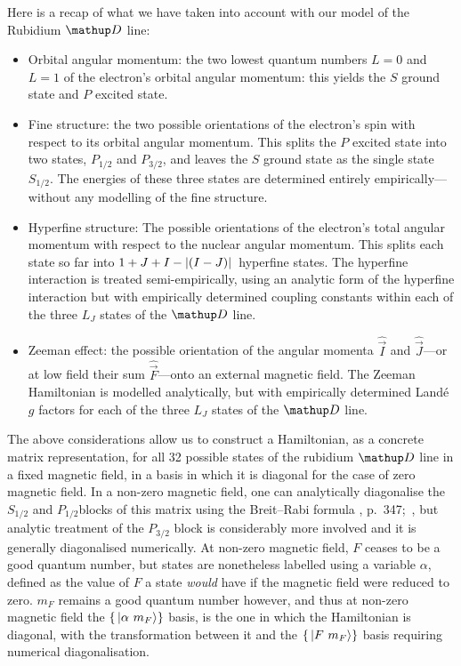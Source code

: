 Here is a recap of what we have taken into account with our model of the Rubidium $\up{D}$ line:
\begin{itemize}
    \item Orbital angular momentum: the two lowest quantum numbers $L=0$ and $L=1$ of the electron's orbital angular momentum: this yields the $S$ ground state and $P$ excited state.
    \item Fine structure: the two possible orientations of the electron's spin with respect to its orbital angular momentum. This splits the $P$ excited state into two states, $P_{1/2}$ and $P_{3/2}$, and leaves the $S$ ground state as the single state $S_{1/2}$. The energies of these three states are determined entirely empirically---without any modelling of the fine structure.
    \item Hyperfine structure: The possible orientations of the electron's total angular momentum with respect to the nuclear angular momentum. This splits each state so far into $1+J+I - \abs{(I - J)}$ hyperfine states. The hyperfine interaction is treated semi-empirically, using an analytic form of the hyperfine interaction but with empirically determined coupling constants within each of the three $L_J$ states of the $\up{D}$ line. 
    \item Zeeman effect: the possible orientation of the angular momenta $\hat{\vec I}$ and $\hat{\vec J}$---or at low field their sum $\hat{\vec F}$---onto an external magnetic field. The Zeeman Hamiltonian is modelled analytically, but with empirically determined Land\'e $g$ factors for each of the three $L_J$ states of the $\up{D}$ line. 
\end{itemize}

The above considerations allow us to construct a Hamiltonian, as a concrete matrix representation, for all 32 possible states of the rubidium $\up{D}$ line in a fixed magnetic field, in a basis in which it is diagonal for the case of zero magnetic field. In a non-zero magnetic field, one can analytically diagonalise the $S_{1/2}$ and $P_{1/2}$blocks of this matrix using the Breit--Rabi formula
\citeleft{}, p.~347;~\citeright, but analytic treatment of the $P_{3/2}$ block is considerably more involved and it is generally diagonalised numerically. At non-zero magnetic field, $F$ ceases to be a good quantum number, but states are nonetheless labelled using a variable $\alpha$, defined as the value of $F$ a state \emph{would} have if the magnetic field were reduced to zero. $m_F$ remains a good quantum number however, and thus at non-zero magnetic field the $\{\ket{\alpha\ m_F}\}$ basis, is the one in which the Hamiltonian is diagonal, with the transformation between it and the $\{\ket{F\ m_F}\}$ basis requiring numerical diagonalisation.

